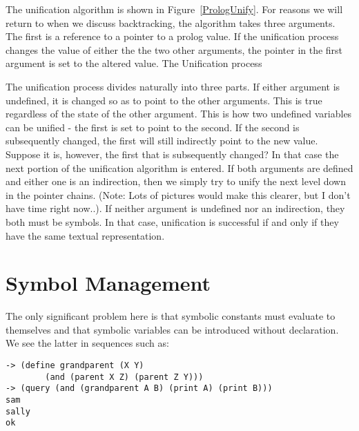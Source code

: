 The unification algorithm is shown in Figure~\ref{PrologUnify}.  For reasons we
will return to when we discuss backtracking, the algorithm takes three
arguments.  The first is a reference to a pointer to a prolog value.  If the
unification process changes the value of either the the two other arguments, the
pointer in the first argument is set to the altered value.
%
{The Unification process}

The unification process divides naturally into three parts.  If either argument
is undefined, it is changed so as to point to the other arguments.  This is true
regardless of the state of the other argument.  This is how two undefined
variables can be unified - the first is set to point to the second.  If the
second is subsequently changed, the first will still indirectly point to the new
value.  Suppose it is, however, the first that is subsequently changed?  In that
case the next portion of the unification algorithm is entered.  If both
arguments are defined and either one is an indirection, then we simply try to
unify the next level down in the pointer chains.  (Note: Lots of pictures would
make this clearer, but I don't have time right now..).  If neither argument is
undefined nor an indirection, they both must be symbols.  In that case,
unification is successful if and only if they have the same textual
representation.

\section{Symbol Management}

The only significant problem here is that symbolic constants must evaluate to
themselves and that symbolic variables can be introduced without declaration.
We see the latter in sequences such as:

\begin{lstlisting}
-> (define grandparent (X Y)
        (and (parent X Z) (parent Z Y)))
-> (query (and (grandparent A B) (print A) (print B)))
sam
sally
ok
\end{lstlisting}

